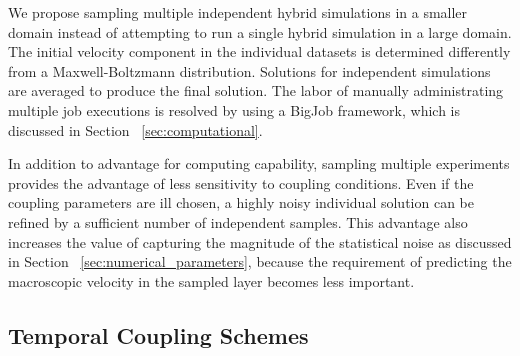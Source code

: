 \documentclass[preprint,12pt]{elsarticle}
\begin{document}
We propose sampling multiple independent hybrid simulations in a smaller domain instead of attempting to run a single hybrid simulation in a large domain. The initial velocity component in the individual datasets is determined differently from a Maxwell-Boltzmann distribution. Solutions for independent simulations are averaged to produce the final solution. The labor of manually administrating multiple job executions is resolved by using a BigJob framework, which is discussed in Section ~\ref{sec:computational}.


In addition to advantage for computing capability, sampling multiple experiments provides the advantage of less sensitivity to coupling conditions. Even if the coupling parameters are ill chosen, a highly noisy individual solution can be refined by a sufficient number of independent samples. This advantage also increases the value of capturing the magnitude of the statistical noise as discussed in Section ~\ref{sec:numerical_parameters}, because the requirement of predicting the macroscopic velocity in the sampled layer becomes less important.


\subsection{Temporal Coupling Schemes}
\label{sec:numerical_temporal}
\end{document}
